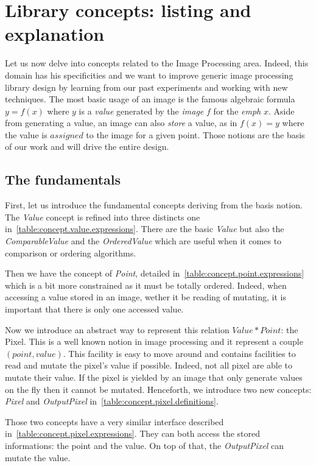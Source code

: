 \section{Library concepts: listing and explanation}
\label{sec:library.concepts}

Let us now delve into concepts related to the Image Processing area. Indeed, this domain has his specificities and we
want to improve generic image processing library design by learning from our past experiments and working with new
techniques. The most basic usage of an image is the famous algebraic formula $y = f(x)$ where $y$ is a \emph{value}
generated by the \emph{image} $f$ for the \emph{emph} $x$. Aside from generating a value, an image can also \emph{store}
a value, as in $f(x) = y$ where the value is $assigned$ to the image for a given point. Those notions are the basis of
our work and will drive the entire design.

\subsection{The fundamentals}

\label{subsec:fundamentals}

First, let us introduce the fundamental concepts deriving from the basis notion. The \emph{Value} concept is refined
into three distincts one in~\cref{table:concept.value.expressions}. There are the basic \emph{Value} but also the
\emph{ComparableValue} and the \emph{OrderedValue} which are useful when it comes to comparison or ordering algorithms.

Then we have the concept of \emph{Point}, detailed in~\cref{table:concept.point.expressions} which is a bit more
constrained as it must be totally ordered. Indeed, when accessing a value stored in an image, wether it be reading of
mutating, it is important that there is only one accessed value.

Now we introduce an abstract way to represent this relation $Value * Point$: the Pixel. This is a well known notion in
image processing and it represent a couple $(point, value)$. This facility is easy to move around and contains
facilities to read and mutate the pixel's value if possible. Indeed, not all pixel are able to mutate their value. If
the pixel is yielded by an image that only generate values on the fly then it cannot be mutated. Henceforth, we
introduce two new concepts: \emph{Pixel} and \emph{OutputPixel} in~\cref{table:concept.pixel.definitions}.

Those two concepts have a very similar interface described in~\cref{table:concept.pixel.expressions}. They can both
access the stored informations: the point and the value. On top of that, the \emph{OutputPixel} can mutate the value.

